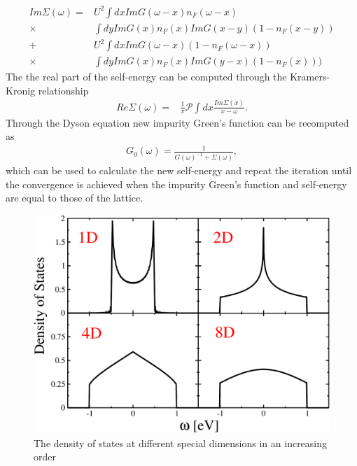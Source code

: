 \documentclass[aps,prl,twocolumn,showpacs,floatfix,superscriptaddress]{revtex4-1}
\begin{document}
\begin{align}
Im \Sigma(\omega) = &  U^2\int dx Im G(\omega-x)n_F(\omega-x)\nonumber\\
\times & \int dy ImG(x)n_F(x)ImG(x-y)(1-n_F(x-y))\nonumber\nonumber\\
+& U^2\int dx Im G(\omega-x)(1-n_F(\omega-x))\nonumber\\
\times & \int dy ImG(x)n_F(x)ImG(y-x)(1-n_F(x))) 
\end{align}
The the real part of the self-energy can be computed through the Kramers-Kronig relationship
\begin{align}
Re\Sigma(\omega)=&\frac{1}{\pi}\mathcal{P}\int dx\frac{Im\Sigma(x)}{x-\omega}.
\end{align}
Through the Dyson equation new impurity Green's function can be recomputed as
\begin{align}
G_0(\omega) = \frac{1}{G(\omega)^{-1}+\Sigma(\omega)},
\end{align}
which can be used to calculate the new self-energy and repeat the iteration until the convergence is achieved when the impurity Green's function and self-energy are equal to those of the lattice.

	\begin{figure}
		\includegraphics[scale=0.3,angle=0]{densities}
		\caption{The density of states at different special dimensions in an increasing order}
		\label{fig:3}
	\end{figure}
\end{document}
